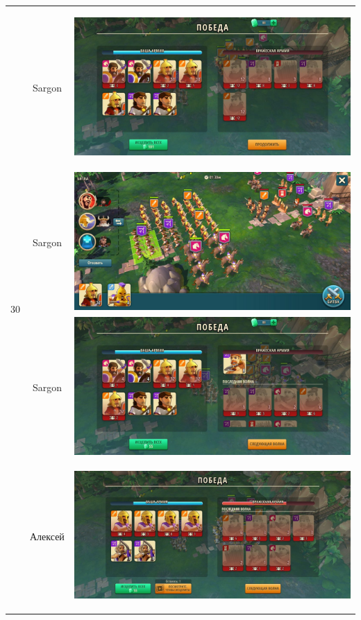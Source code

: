 \begin{longtable}{|c|c|c|}
	\hline
	\multirow{11}{*}{30} & Sargon &
	\hypertarget{fight30}{\includegraphics[width=0.75\linewidth]{./parts/media/TreasureHunt/30/sargon/photo_2022-04-07_10-05-04.jpg}} \\
	& Sargon &
	\includegraphics[width=0.75\linewidth]{./parts/media/TreasureHunt/30/sargon/photo_2022-04-07_10-04-47.jpg} \\
	& Sargon &
	\includegraphics[width=0.75\linewidth]{./parts/media/TreasureHunt/30/sargon/photo_2022-04-07_10-05-00.jpg} \\
	\hline
	\multirow{11}{*}{30} & Алексей &
	\hypertarget{fight30}{\includegraphics[width=0.75\linewidth]{./parts/media/TreasureHunt/30/alexey/photo_2022-04-14_12-36-02.jpg}} \\

\end{longtable}
